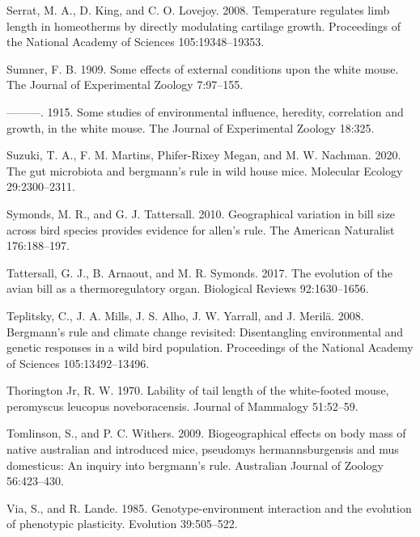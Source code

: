 \documentclass[]{article}
\begin{document}
\leavevmode\hypertarget{ref-Serrat2008}{}%
Serrat, M. A., D. King, and C. O. Lovejoy. 2008. Temperature regulates
limb length in homeotherms by directly modulating cartilage growth.
Proceedings of the National Academy of Sciences 105:19348--19353.

\leavevmode\hypertarget{ref-Sumner1909}{}%
Sumner, F. B. 1909. Some effects of external conditions upon the white
mouse. The Journal of Experimental Zoology 7:97--155.

\leavevmode\hypertarget{ref-Sumner1915}{}%
---------. 1915. Some studies of environmental influence, heredity,
correlation and growth, in the white mouse. The Journal of Experimental
Zoology 18:325.

\leavevmode\hypertarget{ref-Suzuki2020}{}%
Suzuki, T. A., F. M. Martins, Phifer-Rixey Megan, and M. W. Nachman.
2020. The gut microbiota and bergmann's rule in wild house mice.
Molecular Ecology 29:2300--2311.

\leavevmode\hypertarget{ref-Symonds2010}{}%
Symonds, M. R., and G. J. Tattersall. 2010. Geographical variation in
bill size across bird species provides evidence for allen's rule. The
American Naturalist 176:188--197.

\leavevmode\hypertarget{ref-Tattersall2017}{}%
Tattersall, G. J., B. Arnaout, and M. R. Symonds. 2017. The evolution of
the avian bill as a thermoregulatory organ. Biological Reviews
92:1630--1656.

\leavevmode\hypertarget{ref-Teplitsky2008}{}%
Teplitsky, C., J. A. Mills, J. S. Alho, J. W. Yarrall, and J. Merilä.
2008. Bergmann's rule and climate change revisited: Disentangling
environmental and genetic responses in a wild bird population.
Proceedings of the National Academy of Sciences 105:13492--13496.

\leavevmode\hypertarget{ref-Thorington1970}{}%
Thorington Jr, R. W. 1970. Lability of tail length of the white-footed
mouse, peromyscus leucopus noveboracensis. Journal of Mammalogy
51:52--59.

\leavevmode\hypertarget{ref-Tomlinson2009}{}%
Tomlinson, S., and P. C. Withers. 2009. Biogeographical effects on body
mass of native australian and introduced mice, pseudomys
hermannsburgensis and mus domesticus: An inquiry into bergmann's rule.
Australian Journal of Zoology 56:423--430.

\leavevmode\hypertarget{ref-Via1985}{}%
Via, S., and R. Lande. 1985. Genotype-environment interaction and the
evolution of phenotypic plasticity. Evolution 39:505--522.
\end{document}
